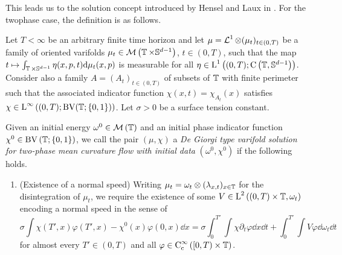 This leads us to the solution concept introduced by Hensel and Laux in 
\cite{hensel_laux_varifold_solution_concept_for_mean_curvature_flow}.
For the twophase case, the definition is as follows.

\begin{definition}
	\label{de_giorgi_varifold_solution_for_mcf}
	Let $ T < \infty $ be an arbitrary finite time horizon and let $ \mu = 
	\operatorname{\mathcal{L}}^{ 1 } \otimes ( \mu_{ t } )_{ t \in ( 0 , T ) } $ be a 
	family of oriented varifolds $ \mu_{ t } \in \mathcal{ M } \left( 
	\operatorname{\mathbb{T}} \times \mathbb{ S }^{ d - 1 } \right) $, $ t \in ( 0 , T ) 
	$, such that the map $ t \mapsto \int_{ \operatorname{\mathbb{T}} \times \mathbb{ S }^{ d 
			-1 } } \eta ( x , p , t ) \dd \mu_{ t } ( x , p ) $ is measurable 
			for all 
	$ \eta \in \operatorname{L}^{ 1 } \left( ( 0 , T ) ; \operatorname{C} \left( \operatorname{\mathbb{T}}, 
	\mathbb{ S 
	}^{ d - 1 } \right) \right) $. 
	Consider also a family $ A = ( A_{ t } )_{ t \in ( 0 , T ) } $ of 
	subsets of $ \operatorname{\mathbb{T}} $ with finite perimeter such that the associated 
	indicator function $ \chi ( x , t ) = \chi_{ A _{ t } } ( x ) $ satisfies 
	$ \chi \in \operatorname{L}^{ \infty } \left( ( 0 , T ) ; \operatorname{BV} ( \operatorname{\mathbb{T}} ; \{ 0 , 
	1 \} ) \right) $.
	Let $ \sigma > 0 $ be a surface tension constant.
	
	Given an initial energy
	$ \omega^{ 0 } \in \mathcal{ M } \left( \operatorname{\mathbb{T}} \right) $ and an initial 
	phase indicator function $ \chi^{ 0 } \in \operatorname{BV} 
	\left( \operatorname{\mathbb{T}} ; \{ 0 , 1 \} \right)$, we call the pair $ ( \mu , \chi ) 
	$ a \emph{De Giorgi type varifold solution for two-phase mean curvature 
	flow 
		with initial data} $ ( \omega^{ 0 } , \chi^{ 0 } ) $ if the following 
		holds.
	\begin{enumerate}
		\item (Existence of a normal speed)
		Writing $ \mu_{ t } = \omega_{ t } \otimes ( \lambda_{ x , t } )_{ x 
			\in \operatorname{\mathbb{T}}} $ for the disintegration of $ \mu_{ t } $, we 
			require 
		the existence of some 
		$ V \in \operatorname{L}^{ 2 } \left( ( 0 , T ) \times \operatorname{\mathbb{T}} ,
		\omega_{ t } \right) $ encoding a normal speed in the sense of
		\begin{equation}
			\label{equation_varifold_velocity}
			\sigma
			\int
			\chi ( T' , x ) \varphi ( T' , x ) 
			-
			\chi^{ 0 } ( x ) \varphi (0,x)
			\dd{ x }
			=
			\sigma
			\int_{ 0 }^{ T' }
			\int
			\chi
			\partial_{ t } \varphi 
			\dd{ x }
			\dd{ t }
			+
			\int_{ 0 }^{ T' }
			\int
			V \varphi 
			\dd{ \omega_{ t } }
			\dd{ t }
		\end{equation}
		for almost every $ T' \in ( 0 , T ) $ and all $ \varphi \in \operatorname{C}_{ 
			\mathrm{c} }^{ \infty } \left( [ 0 , T ) \times \operatorname{\mathbb{T}} \right) 
		$.
		

\end{enumerate}
\end{definition}
